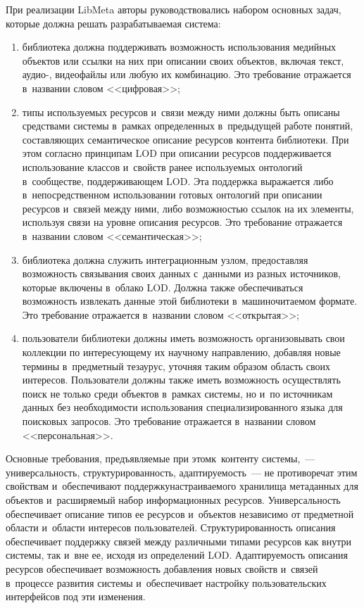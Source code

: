 \begin{multicols}{2}
     При реализации LibMeta авторы руководствовались набором основных 
задач, которые должна решать разрабатываемая система:
     \begin{enumerate}[(1)]
\item библиотека должна поддерживать возможность использования 
медийных объектов или ссылки на них при описании своих объектов, 
включая текст, аудио-, видеофайлы или любую их комбинацию. Это 
требование отражается в~названии словом <<цифровая>>;
\item типы используемых ресурсов и~связи между ними должны быть 
описаны средствами сис\-те\-мы в~рамках определенных в~предыдущей работе 
понятий, составляющих семантическое описание ресурсов контента 
библиотеки. При этом согласно принципам LOD при описании ресурсов 
поддерживается использование классов и~свойств ранее используемых 
онтологий в~сообществе, поддерживающем LOD. Эта поддержка 
выражается либо в~непосредственном использовании готовых онтологий 
при описании ресурсов и~связей между ними, либо возможностью ссылок 
на их элементы, используя связи на уровне описания ресурсов. Это 
требование отражается в~названии словом <<семантическая>>;
\item библиотека должна служить интеграционным узлом, предоставляя 
возможность связывания своих данных с~данными из разных источников, 
которые включены в~облако LOD. Должна также обеспечиваться 
возможность извлекать данные этой библиотеки в~машиночитаемом 
формате. Это требование отражается в~названии словом <<открытая>>;
\item пользователи библиотеки должны иметь возможность организовывать 
свои коллекции по интересующему их научному направлению, добавляя 
новые термины в~предметный тезаурус, уточняя таким образом область 
своих интересов. Пользователи должны также иметь возможность 
осуществлять поиск не только среди объектов в~рамках системы, но и~по 
источникам данных без необходимости использования 
специализированного языка для поисковых запросов. Это требование 
отражается в~названии словом <<персональная>>.
\end{enumerate}

     Основные требования, предъявляемые при этом\linebreak к~контенту  
сис\-те\-мы,~--- универсальность, структурированность, адаптируемость~--- 
не противо\-речат этим свойствам и~обеспечивают поддержку\linebreak настраива\-емого 
хранилища метаданных для объектов и~расширяемый набор 
информационных ресурсов. Универсальность обеспечивает описание типов 
ее ресурсов и~объектов независимо от предметной области и~области 
интересов пользователей. Структурированность описания обеспечивает 
поддержку связей между различными типами ресурсов как внутри системы, 
так и~вне ее, исходя из определений LOD. Адаптируемость описания 
ресурсов обеспечивает возможность добавления новых свойств и~связей 
в~процессе развития системы и~обеспечивает настройку пользовательских 
интерфейсов под эти изменения. 
     

\end{multicols}

